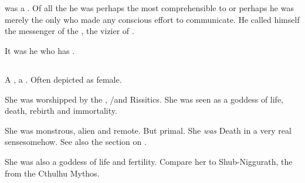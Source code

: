 \chapter{\XzaiShanns}














\section{\Achamoth}
\index{\Achamoth}
\Achamoth was a \xs. 
Of all the \xss he was perhaps the most comprehensible to \Miithians\dash or perhaps he was merely the only \xs who made any conscious effort to communicate. 
He called himself the messenger of the \xss, the vizier of . 

It was he who has . 














\section{\KhothSell}
\index{\KhothSell}
A \firstgendragon, a \xs. 
Often depicted as female.

She was worshipped by the \dragons, \Ortaicans/\rethyaxes and Rissitics.
She was seen as a goddess of life, death, rebirth and immortality. 


She was monstrous, alien and remote. 
But primal. 
She \emph{was} Death in a very real sense\prikker somehow.
See also the section on .

She was also a goddess of life and fertility. 
Compare her to Shub-Niggurath, the  from the Cthulhu Mythos. 

